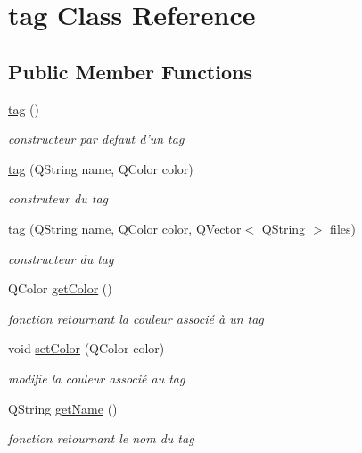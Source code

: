 \hypertarget{classtag}{\section{tag Class Reference}
\label{classtag}
}
\subsection*{Public Member Functions}
\begin{DoxyCompactItemize}
\item 
\hypertarget{classtag_a2fa03e94e684be742a0f1a1a50fbafc9}{\hyperlink{classtag_a2fa03e94e684be742a0f1a1a50fbafc9}{tag} ()}\label{classtag_a2fa03e94e684be742a0f1a1a50fbafc9}

\begin{DoxyCompactList}\small\item\em constructeur par defaut d'un tag \end{DoxyCompactList}\item 
\hyperlink{classtag_aff22891fe1abf1ed5e9b5d440d0158d3}{tag} (Q\-String name, Q\-Color color)
\begin{DoxyCompactList}\small\item\em construteur du tag \end{DoxyCompactList}\item 
\hyperlink{classtag_a76b07b771d1600598aed98d118b94576}{tag} (Q\-String name, Q\-Color color, Q\-Vector$<$ Q\-String $>$ files)
\begin{DoxyCompactList}\small\item\em constructeur du tag \end{DoxyCompactList}\item 
Q\-Color \hyperlink{classtag_ab16256916b9d7bdbf0273ae48af8cc7d}{get\-Color} ()
\begin{DoxyCompactList}\small\item\em fonction retournant la couleur associé à un tag \end{DoxyCompactList}\item 
void \hyperlink{classtag_a90f4405518e74f1ccec80d198a735b77}{set\-Color} (Q\-Color color)
\begin{DoxyCompactList}\small\item\em modifie la couleur associé au tag \end{DoxyCompactList}\item 
Q\-String \hyperlink{classtag_a8cebe9849516a303817cb5a7a4ea9614}{get\-Name} ()
\begin{DoxyCompactList}\small\item\em fonction retournant le nom du tag \end{DoxyCompactList}\item 

\end{DoxyCompactItemize}
